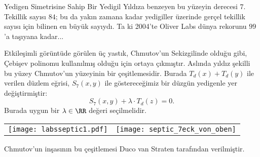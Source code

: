 \begin{surferPage}[Yedigen]{Yedigen Simetrisine Sahip Bir Yedigil}
Yıldıza benzeyen bu yüzeyin derecesi  $7$.
Tekillik sayısı $84$; bu da yakın zamana kadar yedigiller üzerinde gerçel tekillik sayısı için bilinen en büyük sayıydı. Ta ki 2004'te  Oliver Labs dünya rekorunu $99$'a taşıyana kadar...
  
Etkileşimli görüntüde görülen üç yastık, Chmutov'un Sekizgilinde olduğu gibi, Çebişev polinomu kullanılmış olduğu için ortaya çıkmıştır.
Aslında yıldız şekilli bu yüzey Chmutov'un yüzeyinin bir çeşitlemesidir.
Burada $T_d(x)+T_d(y)$ ile verilen düzlem eğrisi, $S_7(x,y)$ ile göstereceğimiz bir düzgün yedigenle yer değiştirmiştir:
   \[S_7(x,y) + \lambda \cdot T_d(z) = 0.\]
Burada uygun bir $\lambda\in\RR$ değeri seçilmelidir. 
    \vspace*{-0.3em}
    \begin{center}
      \begin{tabular}{c@{\qquad}c}
        \texttt{[image: labsseptic1.pdf]}
        &
        \texttt{[image: septic\_7eck\_von\_oben]}
      \end{tabular}
    \end{center}
    \vspace*{-0.3em}   
Chmutov'un inşasının bu çeşitlemesi Duco van Straten tarafından verilmiştir.
\end{surferPage}

